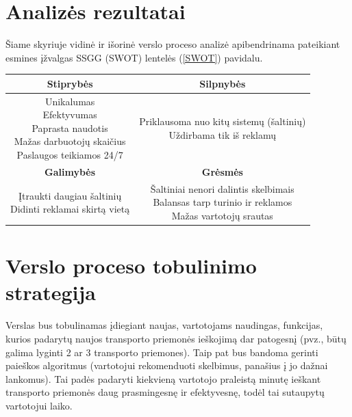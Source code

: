 \documentclass[12pt]{article}
\begin{document}
	\section{Analizės rezultatai}
	
	Šiame skyriuje vidinė ir išorinė verslo proceso analizė apibendrinama pateikiant esmines įžvalgas SSGG (SWOT) lentelės (\ref{SWOT}) pavidalu.
	
	\begin{center}
		\begin{tabular}{ | c | c | }
			\hline
			\textbf{Stiprybės} & \textbf{Silpnybės} \\ \hline 
			\makecell{Unikalumas \\ Efektyvumas \\ Paprasta naudotis \\ Mažas darbuotojų skaičius \\ Paslaugos teikiamos 24/7} & \makecell{Priklausoma nuo kitų sistemų (šaltinių) \\ Uždirbama tik iš reklamų} \\ \hline
			\textbf{Galimybės} & \textbf{Grėsmės} \\ \hline
			\makecell{Įtraukti daugiau šaltinių \\ Didinti reklamai skirtą vietą \\} & \makecell{Šaltiniai nenori dalintis skelbimais \\ Balansas tarp turinio ir reklamos \\ Mažas vartotojų srautas} \\ \hline 
		\end{tabular}
	\end{center}
	\pagebreak	
	
	\section{Verslo proceso tobulinimo strategija}
	
	Verslas bus tobulinamas įdiegiant naujas, vartotojams naudingas, funkcijas, kurios padarytų naujos transporto priemonės ieškojimą dar patogesnį (pvz., būtų galima lyginti 2 ar 3 transporto priemones). Taip pat bus bandoma gerinti paieškos algoritmus (vartotojui rekomenduoti skelbimus, panašius į jo dažnai lankomus). Tai padės padaryti kiekvieną vartotojo praleistą minutę ieškant transporto priemonės daug prasmingesnę ir efektyvesnę, todėl tai sutaupytų vartotojui laiko.
	\bigskip	
	
\end{document}
